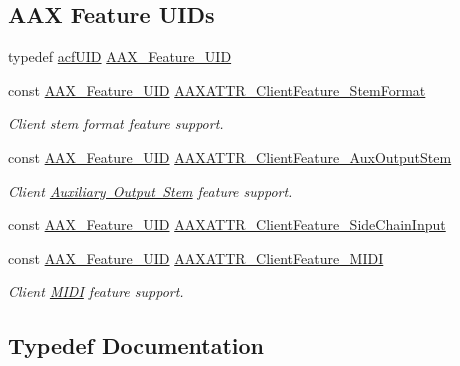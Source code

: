 \subsection*{A\+AX Feature U\+I\+Ds}
\begin{DoxyCompactItemize}
\item 
typedef \mbox{\hyperlink{a00269_ab19414382287ff80930c48a196145214}{acf\+U\+ID}} \mbox{\hyperlink{a00683_a53d6cf8a08224b3e813333e411ce798e}{A\+A\+X\+\_\+\+Feature\+\_\+\+U\+ID}}
\item 
const \mbox{\hyperlink{a00392_a53d6cf8a08224b3e813333e411ce798e}{A\+A\+X\+\_\+\+Feature\+\_\+\+U\+ID}} \mbox{\hyperlink{a00683_a0a8849a8e49eca48475bb88a1da25d5d}{A\+A\+X\+A\+T\+T\+R\+\_\+\+Client\+Feature\+\_\+\+Stem\+Format}}
\begin{DoxyCompactList}\small\item\em Client stem format feature support. \end{DoxyCompactList}\item 
const \mbox{\hyperlink{a00392_a53d6cf8a08224b3e813333e411ce798e}{A\+A\+X\+\_\+\+Feature\+\_\+\+U\+ID}} \mbox{\hyperlink{a00683_aa6369eb43ac68152d30ec665de5ea603}{A\+A\+X\+A\+T\+T\+R\+\_\+\+Client\+Feature\+\_\+\+Aux\+Output\+Stem}}
\begin{DoxyCompactList}\small\item\em Client \mbox{\hyperlink{a00809}{Auxiliary Output Stem}} feature support. \end{DoxyCompactList}\item 
const \mbox{\hyperlink{a00392_a53d6cf8a08224b3e813333e411ce798e}{A\+A\+X\+\_\+\+Feature\+\_\+\+U\+ID}} \mbox{\hyperlink{a00683_ad130c555cc62e4fbc5c8101d8d10ae45}{A\+A\+X\+A\+T\+T\+R\+\_\+\+Client\+Feature\+\_\+\+Side\+Chain\+Input}}
\item 
const \mbox{\hyperlink{a00392_a53d6cf8a08224b3e813333e411ce798e}{A\+A\+X\+\_\+\+Feature\+\_\+\+U\+ID}} \mbox{\hyperlink{a00683_ab018f9c736d0ffd41f1f67e77fa96773}{A\+A\+X\+A\+T\+T\+R\+\_\+\+Client\+Feature\+\_\+\+M\+I\+DI}}
\begin{DoxyCompactList}\small\item\em Client \mbox{\hyperlink{a00806}{M\+I\+DI}} feature support. \end{DoxyCompactList}\end{DoxyCompactItemize}


\subsection{Typedef Documentation}
\mbox{\label{a00683_a53d6cf8a08224b3e813333e411ce798e}} 
